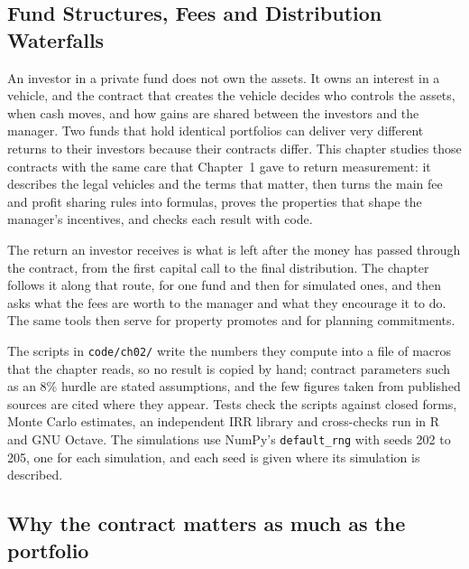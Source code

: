 
\begin{chapterrefs}
\setcounter{chapter}{1}
\chapter{Fund Structures, Fees and Distribution Waterfalls}
\label{ch:structures}

An investor in a private fund does not own the assets. It owns an interest in a vehicle, and the
contract that creates the vehicle decides who controls the assets, when cash moves, and how gains are
shared between the investors and the manager. Two funds that hold identical portfolios can deliver very
different returns to their investors because their contracts differ. This chapter studies those
contracts with the same care that Chapter~1 gave to return measurement: it describes the legal
vehicles and the terms that matter, then turns the main fee and profit sharing rules into formulas, proves
the properties that shape the manager's incentives, and checks each result with code.

The return an investor receives is what is left after the money has passed through the contract,
from the first capital call to the final distribution. The chapter follows it along that route, for
one fund and then for \mcN{} simulated ones, and then asks what the fees are worth to the manager and
what they encourage it to do. The same tools then serve for property promotes and for planning
commitments.

\begin{keybox}
The scripts in \texttt{code/ch02/} write the numbers they compute into a file of macros
that the chapter reads, so no result is copied by hand; contract parameters such as an 8\% hurdle are
stated assumptions, and the few figures taken from published sources are cited where they appear. Tests check the scripts against closed forms, Monte
Carlo estimates, an independent IRR library and cross-checks run in R and GNU Octave. The simulations use NumPy's
\texttt{default\_rng} with seeds 202 to 205, one for each simulation, and each seed is
given where its simulation is described.
\end{keybox}
\section{Why the contract matters as much as the portfolio}
\label{sec2:why}


\end{chapterrefs}
